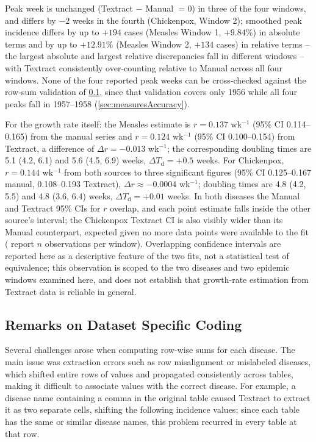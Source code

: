 \documentclass[12pt]{article}
\begin{document}
Peak week is unchanged (Textract $-$ Manual $= 0$) in three of the four windows, and differs by $-2$ weeks in the fourth (Chickenpox, Window 2); smoothed peak incidence differs by up to $+194$ cases (Measles Window 1, $+9.84\%$) in absolute terms and by up to $+12.91\%$ (Measles Window 2, $+134$ cases) in relative terms -- the largest absolute and largest relative discrepancies fall in different windows -- with Textract consistently over-counting relative to Manual across all four windows. None of the four reported peak weeks can be cross-checked against the row-sum validation of \cref{sec:hardcoding}, since that validation covers only 1956 while all four peaks fall in 1957--1958 (\cref{sec:measuresAccuracy}).

For the growth rate itself: the Measles estimate is $r = 0.137$ wk$^{-1}$ (95\% CI 0.114--0.165) from the manual series and $r = 0.124$ wk$^{-1}$ (95\% CI 0.100--0.154) from Textract, a difference of $\Delta r = -0.013$ wk$^{-1}$; the corresponding doubling times are 5.1 (4.2, 6.1) and 5.6 (4.5, 6.9) weeks, $\Delta T_{\mathrm{d}} = +0.5$ weeks. For Chickenpox, $r = 0.144$ wk$^{-1}$ from both sources to three significant figures (95\% CI 0.125--0.167 manual, 0.108--0.193 Textract), $\Delta r \approx -0.0004$ wk$^{-1}$; doubling times are 4.8 (4.2, 5.5) and 4.8 (3.6, 6.4) weeks, $\Delta T_{\mathrm{d}} = +0.01$ weeks. In both diseases the Manual and Textract 95\% CIs for $r$ overlap, and each point estimate falls inside the other source's interval; the Chickenpox Textract CI is also visibly wider than its Manual counterpart, expected given no more data points were available to the fit ( report $n$ observations per window). Overlapping confidence intervals are reported here as a descriptive feature of the two fits, not a statistical test of equivalence; this observation is scoped to the two diseases and two epidemic windows examined here, and does not establish that growth-rate estimation from Textract data is reliable in general.


\subsection{Remarks on Dataset Specific Coding}\label{sec:hardcoding}

Several challenges arose when computing row-wise sums for each disease. The main issue was extraction errors such as row misalignment or mislabeled diseases, which shifted entire rows of values and propagated consistently across tables, making it difficult to associate values with the correct disease. For example, a disease name containing a comma in the original table caused Textract to extract it as two separate cells, shifting the following incidence values; since each table has the same or similar disease names, this problem recurred in every table at that row.
\end{document}
